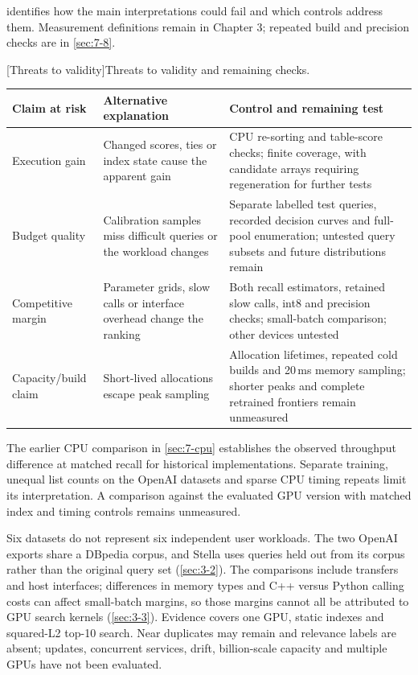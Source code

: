  identifies how the main interpretations could fail
and which controls address them. Measurement definitions remain in
Chapter 3; repeated build and precision checks are in \cref{sec:7-8}.

\par\medskip\noindent\begin{minipage}{\linewidth}
\centering\captionsetup{hypcap=false}
[Threats to validity]{Threats to validity and remaining checks.}
\label{tab:8-threats}
\footnotesize\setlength{\tabcolsep}{4pt}
\begin{tabularx}{\linewidth}{@{}*{3}{>{\raggedright\arraybackslash}X}@{}}
\toprule
Claim at risk & Alternative explanation & Control and remaining test \\
\midrule
Execution gain & Changed scores, ties or index state cause the apparent gain & CPU re-sorting and table-score checks; finite coverage, with candidate arrays requiring regeneration for further tests \\
Budget quality & Calibration samples miss difficult queries or the workload changes & Separate labelled test queries, recorded decision curves and full-pool enumeration; untested query subsets and future distributions remain \\
Competitive margin & Parameter grids, slow calls or interface overhead change the ranking & Both recall estimators, retained slow calls, int8 and precision checks; small-batch comparison; other devices untested \\
Capacity/build claim & Short-lived allocations escape peak sampling & Allocation lifetimes, repeated cold builds and 20\,ms memory sampling; shorter peaks and complete retrained frontiers remain unmeasured \\
\bottomrule
\end{tabularx}
\end{minipage}\par\medskip

The earlier CPU comparison in \cref{sec:7-cpu} establishes the observed
throughput difference at matched recall for historical implementations.
Separate training, unequal list counts on the OpenAI datasets and sparse
CPU timing repeats limit its interpretation. A comparison against the
evaluated GPU version with matched index and timing controls remains
unmeasured.

Six datasets do not represent six independent user workloads. The two
OpenAI exports share a DBpedia corpus, and Stella uses queries held out
from its corpus rather than the original query set (\cref{sec:3-2}).
The comparisons include transfers and host interfaces; differences in
memory types and C++ versus Python calling costs can affect small-batch
margins, so those margins cannot all be attributed to GPU search kernels
(\cref{sec:3-3}). Evidence covers one GPU, static indexes and squared-L2
top-10 search. Near duplicates may remain and relevance labels are
absent; updates, concurrent services, drift, billion-scale capacity and
multiple GPUs have not been evaluated.
